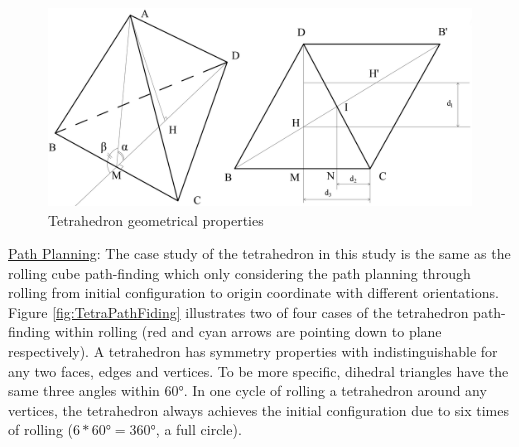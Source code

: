 \begin{figure}[h]
\centering
	\includegraphics[width=\textwidth]{image/TetraGeo11.png}
%	
	\caption{Tetrahedron geometrical properties}
	\label{fig:tetraGeo1}
\end{figure}

\noindent\uline{Path Planning}:
The case study of the tetrahedron in this study is the same as the rolling cube path-finding which only considering the path planning through rolling from initial configuration to origin coordinate with different orientations. 
Figure \ref{fig:TetraPathFiding} illustrates two of four cases of the tetrahedron path-finding within rolling (red and cyan arrows are pointing down to plane respectively). 
A tetrahedron has symmetry properties with indistinguishable for any two faces, edges and vertices. To be more specific, dihedral triangles have the same three angles within $\ang{60}$. 
In one cycle of rolling a tetrahedron around any vertices, the tetrahedron always achieves the initial configuration due to six times of rolling ($6*\ang{60}=\ang{360}$, a full circle). \\

